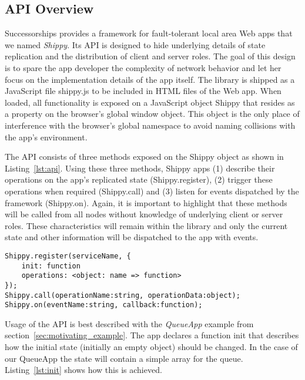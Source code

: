 \subsection{API Overview}
\label{sub:approach_api_overview}

Successorships provides a framework for fault-tolerant local area Web apps that we named \textit{Shippy}.
Its API is designed to hide underlying details of state replication and the distribution of client and server roles.
The goal of this design is to spare the app developer the complexity of network behavior and let her focus on the implementation details of the app itself.
The library is shipped as a JavaScript file {\ttfamily shippy.js} to be included in HTML files of the Web app.
When loaded, all functionality is exposed on a JavaScript object {\ttfamily Shippy} that resides as a property on the browser's global {\ttfamily window} object.
This object is the only place of interference with the browser's global namespace to avoid naming collisions with the app's environment.

The API consists of three methods exposed on the {\ttfamily Shippy} object as shown in Listing~\ref{lst:api}.
Using these three methods, Shippy apps (1) describe their operations on the app's replicated state ({\ttfamily Shippy.register}), (2) trigger these operations when required ({\ttfamily Shippy.call}) and (3) listen for events dispatched by the framework ({\ttfamily Shippy.on}).
Again, it is important to highlight that these methods will be called from all nodes without knowledge of underlying client or server roles.
These characteristics will remain within the library and only the current state and other information will be dispatched to the app with events.

\begin{lstlisting}[caption={Successorships API},label={lst:api}]
Shippy.register(serviceName, {
    init: function
    operations: <object: name => function>
});
Shippy.call(operationName:string, operationData:object);
Shippy.on(eventName:string, callback:function);
\end{lstlisting}

Usage of the API is best described with the \textit{QueueApp} example from section~\ref{sec:motivating_example}.
The app declares a function {\ttfamily init} that describes how the initial state (initially an empty object) should be changed.
In the case of our QueueApp the state will contain a simple array for the queue.
Listing~\ref{lst:init} shows how this is achieved.

